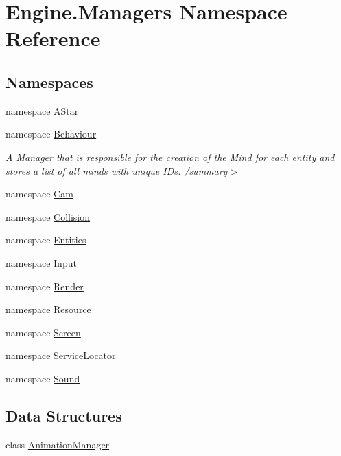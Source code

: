 \hypertarget{a00239}{}\section{Engine.\+Managers Namespace Reference}
\label{a00239}
\subsection*{Namespaces}
\begin{DoxyCompactItemize}
\item 
namespace \hyperlink{a00241}{A\+Star}
\item 
namespace \hyperlink{a00266}{Behaviour}
\begin{DoxyCompactList}\small\item\em A Manager that is responsible for the creation of the Mind for each entity and stores a list of all minds with unique I\+Ds. /summary$>$ \end{DoxyCompactList}\item 
namespace \hyperlink{a00267}{Cam}
\item 
namespace \hyperlink{a00268}{Collision}
\item 
namespace \hyperlink{a00269}{Entities}
\item 
namespace \hyperlink{a00270}{Input}
\item 
namespace \hyperlink{a00271}{Render}
\item 
namespace \hyperlink{a00272}{Resource}
\item 
namespace \hyperlink{a00273}{Screen}
\item 
namespace \hyperlink{a00274}{Service\+Locator}
\item 
namespace \hyperlink{a00275}{Sound}
\end{DoxyCompactItemize}
\subsection*{Data Structures}
\begin{DoxyCompactItemize}
\item 
class \hyperlink{a00298}{Animation\+Manager}
\end{DoxyCompactItemize}
